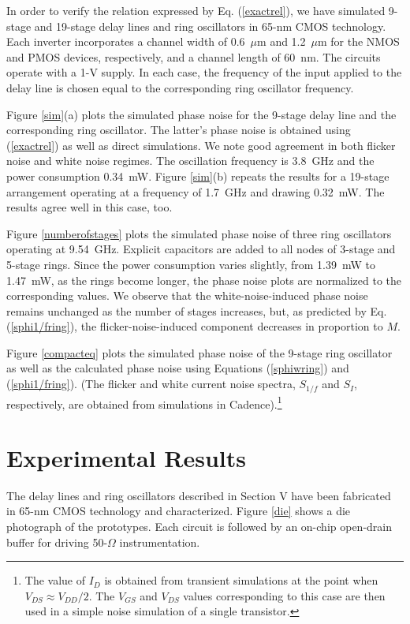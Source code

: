In order to verify the relation expressed by Eq. (\ref{exactrel}), we have simulated 9-stage and 19-stage delay lines and ring oscillators in 65-nm CMOS technology. Each
inverter incorporates a channel width of 0.6~$\mu$m and 1.2~$\mu$m for the NMOS and PMOS devices, respectively, and a channel length of 60~nm. The circuits operate
with a 1-V supply. In each case, the frequency of the input applied to the delay line is chosen equal to the corresponding ring oscillator frequency. 

Figure \ref{sim}(a) plots the simulated phase noise for the 9-stage delay line and the corresponding ring oscillator.
The latter's phase noise is obtained using
(\ref{exactrel}) as well as direct simulations. We note good agreement in both flicker noise and white noise regimes. The oscillation frequency is 3.8~GHz and the power
consumption 0.34~mW. Figure \ref{sim}(b) repeats the results for a 19-stage arrangement operating at a frequency of 1.7~GHz and drawing 0.32~mW. The results agree well
in this case, too.

Figure \ref{numberofstages} plots the simulated phase noise of three ring oscillators operating at 9.54~GHz. Explicit capacitors are added to all nodes of 3-stage and
5-stage rings.
Since the power consumption varies slightly, from 1.39~mW to 1.47~mW, as the rings become longer, the phase noise plots
are normalized to the corresponding values. We observe that the white-noise-induced phase noise remains unchanged as the number of stages increases, but, as predicted by 
Eq. (\ref{sphi1/fring}), the flicker-noise-induced component decreases in proportion to $M$. 


Figure \ref{compacteq} plots the simulated phase noise of the 9-stage ring oscillator as well as the calculated phase noise using
Equations (\ref{sphiwring}) and (\ref{sphi1/fring}). 
(The flicker and white current noise spectra, $S_{1/f}$ and $S_I$, respectively, are obtained from simulations in Cadence).\footnote{The value of $I_D$ is
obtained from transient simulations at the point when $V_{DS}\approx V_{DD}/2$. The $V_{GS}$ and $V_{DS}$ values corresponding to this case are then used in a simple noise
simulation of a single transistor.}




\section{Experimental Results}

The delay lines and ring oscillators described in Section V have been fabricated in 65-nm CMOS technology and characterized. Figure \ref{die} shows a die photograph
of the prototypes. Each circuit is followed by an on-chip open-drain buffer for driving 50-$\Omega$ instrumentation.



